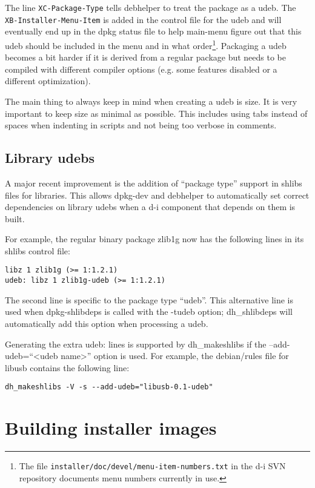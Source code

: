 \documentclass[a4paper,10pt]{article}
\begin{document}
The line \texttt{XC-Package-Type} tells debhelper to treat the package as a udeb. The \texttt{XB-Installer-Menu-Item} is added in the control file for the udeb and will eventually end up in the dpkg status file to help main-menu figure out that this udeb should be included in the menu and in what order\footnote{The file \texttt{installer/doc/devel/menu-item-numbers.txt} in the d-i SVN repository documents menu numbers currently in use.}. Packaging a udeb becomes a bit harder if it is derived from a regular package but needs to be compiled with different compiler options (e.g. some features disabled or a different optimization). 

The main thing to always keep in mind when creating a udeb is size. It is very important to keep size as minimal as possible. This includes using tabs instead of spaces when indenting in scripts and not being too verbose in comments. 


\subsection{Library udebs}
A major recent improvement is the addition of “package type” support in shlibs files for libraries. This allows dpkg-dev and debhelper to automatically set correct dependencies on library udebs when a d-i component that depends on them is built. 

For example, the regular binary package zlib1g now has the following lines in its shlibs control file:

\begin{verbatim}
libz 1 zlib1g (>= 1:1.2.1)
udeb: libz 1 zlib1g-udeb (>= 1:1.2.1)
\end{verbatim}

The second line is specific to the package type “udeb”. This alternative line is used when dpkg-shlibdeps is called with the -tudeb option; dh\_shlibdeps will automatically add this option when processing a udeb. 

Generating the extra udeb: lines is supported by dh\_makeshlibs if the --add-udeb=“<udeb name>” option is used. For example, the debian/rules file for libusb contains the following line: 

\begin{verbatim}
dh_makeshlibs -V -s --add-udeb="libusb-0.1-udeb"
\end{verbatim}


\section{Building installer images}
\end{document}
